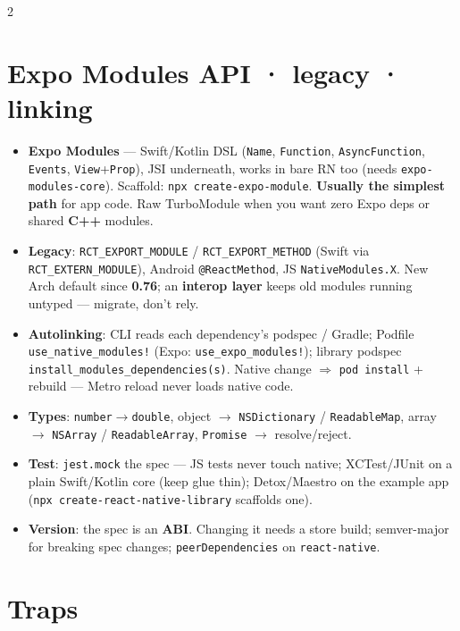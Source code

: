 \documentclass[8pt]{extarticle}
\begin{document}
\begin{multicols}{2}
\section{Expo Modules API · legacy · linking}
\begin{itemize}
  \item \textbf{Expo Modules} — Swift/Kotlin DSL (\texttt{Name}, \texttt{Function},
        \texttt{AsyncFunction}, \texttt{Events}, \texttt{View}+\texttt{Prop}), JSI
        underneath, works in bare RN too (needs \texttt{expo-modules-core}). Scaffold:
        \texttt{npx create-expo-module}. \textbf{Usually the simplest path} for app code.
        Raw TurboModule when you want zero Expo deps or shared \textbf{C++} modules.
  \item \textbf{Legacy}: \texttt{RCT\_EXPORT\_MODULE} / \texttt{RCT\_EXPORT\_METHOD}
        (Swift via \texttt{RCT\_EXTERN\_MODULE}), Android \texttt{@ReactMethod}, JS
        \texttt{NativeModules.X}. New Arch default since \textbf{0.76}; an
        \textbf{interop layer} keeps old modules running untyped — migrate, don't rely.
  \item \textbf{Autolinking}: CLI reads each dependency's podspec / Gradle; Podfile
        \texttt{use\_native\_modules!} (Expo: \texttt{use\_expo\_modules!}); library
        podspec \texttt{install\_modules\_dependencies(s)}. Native change $\Rightarrow$
        \texttt{pod install} + rebuild — Metro reload never loads native code.
  \item \textbf{Types}: \texttt{number}$\to$\texttt{double}, object $\to$
        \texttt{NSDictionary} / \texttt{ReadableMap}, array $\to$ \texttt{NSArray} /
        \texttt{ReadableArray}, \texttt{Promise} $\to$ resolve/reject.
  \item \textbf{Test}: \texttt{jest.mock} the spec — JS tests never touch native;
        XCTest/JUnit on a plain Swift/Kotlin core (keep glue thin); Detox/Maestro on the
        example app (\texttt{npx create-react-native-library} scaffolds one).
  \item \textbf{Version}: the spec is an \textbf{ABI}. Changing it needs a store build;
        semver-major for breaking spec changes; \texttt{peerDependencies} on
        \texttt{react-native}.
\end{itemize}

\section{Traps}
\begin{itemize}
\end{itemize}


\end{multicols}
\end{document}

